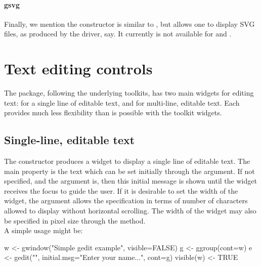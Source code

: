 \paragraph{gsvg}
Finally, we mention the  constructor is similar to
, but allows one to display SVG files, as produced
by the  driver, say. It currently is not available for
 and .


\section{Text editing controls}
\label{sec:gWidgets-text-edit-contr}
The  package, following the underlying toolkits, has two
main widgets for editing text:  for a single line
of editable text, and  for multi-line, editable
text. Each provides much less flexibility than is possible with the
toolkit widgets.



\subsection{Single-line, editable text}
\label{sec:gWidgets-single-line-editable}


The  constructor produces a widget to display a
single line of editable text. The main property is the text which can
be set initially through the  argument.  If 
not specified, and the argument  is,
then this initial message is shown until the widget receives the focus
to guide the user.  If it is desirable to set the width of the widget,
the  argument allows the specification in terms
of number of characters allowed to display without horizontal
scrolling. The width of the widget may also be specified in pixel size
through the  method.
\\

A simple usage might be:
\begin{Schunk}
\begin{Sinput}
 w <- gwindow("Simple gedit example", visible=FALSE)
 g <- ggroup(cont=w)
 e <- gedit("", initial.msg="Enter your name...", cont=g)
 visible(w) <- TRUE
\end{Sinput}
\end{Schunk}



